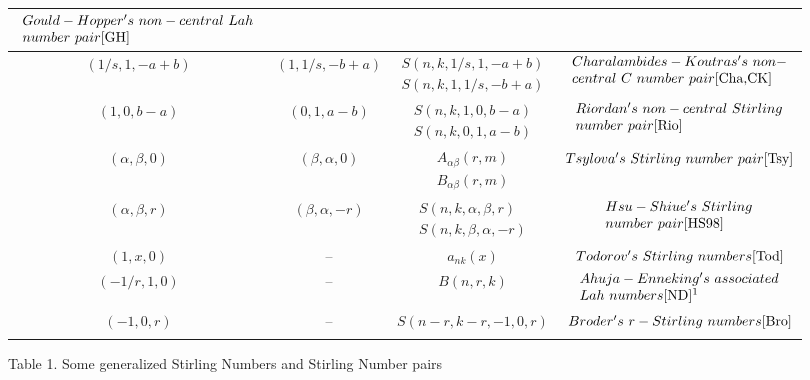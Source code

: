 \begin{center}
\begin{tabular}{c|c|c|c}
$\begin{array}{l} Gould-Hopper's\ non-central\ Lah\\ number \ pair \cite{GH}\end{array}$
\footnotemark\\ \hline
\rule[-3mm]{0mm}{8mm}
$(1/s,1,-a+b)$ & $(1,1/s, -b+a)$ & $\begin{array}{cc}S(n,k,1/s,1,-a+b)\\S(n,k, 1,1/s, -b+a)\end{array}$ &
$\begin{array} {l} Charalambides-Koutras's\ non-\\central \ C \ number \ pair\cite{Cha,CK}\end{array}$\footnotemark
\\ \hline
\rule[-3mm]{0mm}{8mm}
$(1,0, b-a)$  & $(0,1,a-b)$ &  $\begin{array}{cc}S(n,k,1,0,b-a)\\S(n,k,0,1,a-b)\end{array}$ &
$\begin{array}{l} Riordan's\ non-central \ Stirling\\
number\ pair \cite{Rio}\end{array}$ \\ \hline
\rule[-3mm]{0mm}{8mm}
$(\alpha,\beta,0)$ & $(\beta,\alpha,0)$ &
$\begin{array}{cc}A_{\alpha\beta}(r,m)\\B_{\alpha\beta}(r,m)\end{array}$& $Tsylova's\ Stirling\ number\ pair\cite{Tsy}$\\ \hline
\rule[-3mm]{0mm}{8mm}
$(\alpha,\beta,r)$ & $(\beta,\alpha,-r)$
& $\begin{array}{cc}S(n,k, \alpha, \beta,r)\\S(n,k,\beta, \alpha,-r)\end{array}$ & $\begin{array}{l} Hsu-Shiue's \ Stirling\\ number\ pair\cite{HS98}\end{array}$\\ \hline
\rule[-3mm]{0mm}{8mm}
$(1,x,0)$ &
-- &
$a_{nk}(x)$  & $Todorov's\ Stirling\ numbers\cite{Tod}$  \\ \hline
\rule[-3mm]{0mm}{8mm}
$(-1/r,1,0)$ &
 -- &  $B(n,r,k)$ & $\begin{array}{l} Ahuja-Enneking's
\ associated\\  Lah\ numbers\cite{ND}\footnotemark \end{array}$
\\ \hline
\rule[-3mm]{0mm}{8mm}
$(-1,0,r)$  &
-- &   $S(n-r, k-r, -1,0,r)$ & $Broder's \ r-Stirling\ numbers \cite{Bro}$\\ \hline
\rule[-3mm]{0mm}{8mm}
\end{tabular}
\centerline{Table 1. Some generalized Stirling Numbers and Stirling Number pairs}
\end{center}
\vspace{.15in}

